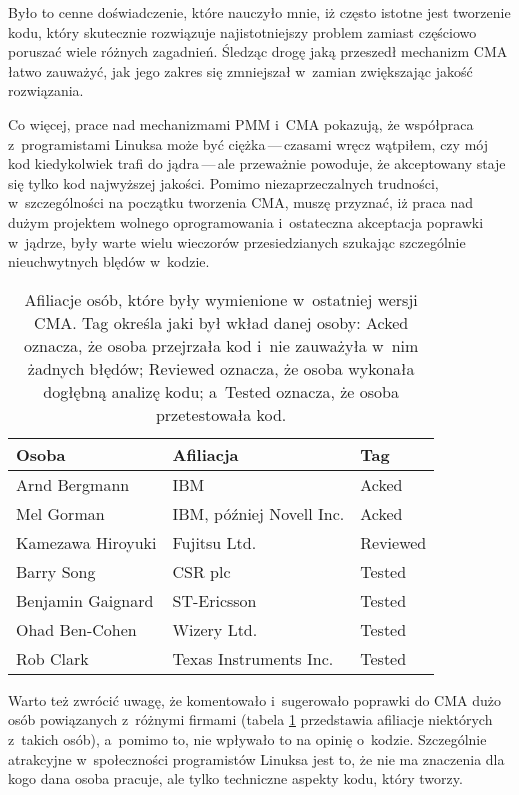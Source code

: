 Było to cenne doświadczenie, które nauczyło mnie, iż często istotne
jest tworzenie kodu, który skutecznie rozwiązuje najistotniejszy
problem zamiast częściowo poruszać wiele różnych zagadnień.  Śledząc
drogę jaką przeszedł mechanizm CMA łatwo zauważyć, jak jego zakres się
zmniejszał w~zamian zwiększając jakość rozwiązania.

Co więcej, prace nad mechanizmami PMM i~CMA pokazują, że współpraca
z~programistami Linuksa może być ciężka\,---\,czasami wręcz wątpiłem,
czy mój kod kiedykolwiek trafi do jądra\,---\,ale przeważnie powoduje,
że akceptowany staje się tylko kod najwyższej jakości.  Pomimo
niezaprzeczalnych trudności, w~szczególności na początku tworzenia
CMA, muszę przyznać, iż praca nad dużym projektem wolnego
oprogramowania i~ostateczna akceptacja poprawki w~jądrze, były warte
wielu wieczorów przesiedzianych szukając szczególnie nieuchwytnych
blędów w~kodzie.

\begin{table}[htbp]
\begin{center}
\begin{tabular}{lll}
Osoba             & Afiliacja                & Tag \\
\hline
Arnd Bergmann     & IBM                      & Acked \\
Mel Gorman        & IBM, później Novell Inc. & Acked \\
Kamezawa Hiroyuki & Fujitsu Ltd.             & Reviewed \\
Barry Song        & CSR plc                  & Tested \\
Benjamin Gaignard & ST-Ericsson              & Tested \\
Ohad Ben-Cohen    & Wizery Ltd.              & Tested \\
Rob Clark         & Texas Instruments Inc.   & Tested \\
\end{tabular}
\end{center}
\caption{Afiliacje osób, które były wymienione w~ostatniej wersji CMA.
  Tag określa jaki był wkład danej osoby: Acked oznacza, że osoba
  przejrzała kod i~nie zauważyła w~nim żadnych błędów; Reviewed
  oznacza, że osoba wykonała dogłębną analizę kodu; a~Tested oznacza,
  że osoba przetestowała kod.}
\label{tab:cma-ppl}
\end{table}

Warto też zwrócić uwagę, że komentowało i~sugerowało poprawki do CMA
dużo osób powiązanych z~różnymi firmami (tabela \ref{tab:cma-ppl}
przedstawia afiliacje niektórych z~takich osób), a~pomimo to, nie
wpływało to na opinię o~kodzie.  Szczególnie atrakcyjne w~społeczności
programistów Linuksa jest to, że nie ma znaczenia dla kogo dana osoba
pracuje, ale tylko techniczne aspekty kodu, który tworzy.
